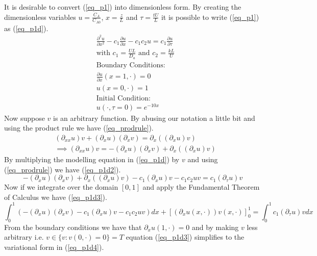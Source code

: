 \documentclass[11pt,fleqn]{article}
\theoremstyle{defstyle}
\begin{document}
It is desirable to convert (\ref{eq_p1}) into dimensionless form. By creating the dimensionless variables $u=\frac{C_A}{C_{A0}}$, $x = \frac{z}{L}$ and $\tau = \frac{tU}{L}$ it is possible to write (\ref{eq_p1}) as (\ref{eq_p1d}).
\begin{equation}
\begin{aligned}
&\frac{\partial^2 u}{\partial x^2} - c_1 \frac{\partial u}{\partial x} - c_1c_2u = 
c_1\frac{\partial u}{\partial \tau} \\
&\text{with } c_1 = \frac{UL}{D_a} \text{ and } c_2 = \frac{kL}{U} \\
&\text{Boundary Conditions:} \\
&\frac{\partial u}{\partial x}(x=1, \cdot) = 0\\
&u(x=0, \cdot) = 1 \\
&\text{Initial Condition:} \\
& u(\cdot, \tau = 0) = e^{-10x}
\end{aligned}
\label{eq_p1d}
\end{equation}
Now suppose $v$ is an arbitrary function. By abusing our notation a little bit and using the product rule we have (\ref{eq_prodrule}).
\begin{equation}
\begin{aligned}
&(\partial_{xx}u)v + (\partial_xu)(\partial_xv) = \partial_x( (\partial_xu)v)\\
&\implies (\partial_{xx}u)v = -(\partial_xu)(\partial_xv) + \partial_x( (\partial_xu)v)
\end{aligned}
\label{eq_prodrule}
\end{equation}
By multiplying the modelling equation in (\ref{eq_p1d}) by $v$ and using (\ref{eq_prodrule}) we have (\ref{eq_p1d2}).
\begin{equation}
 -(\partial_xu)(\partial_xv) + \partial_x( (\partial_xu)v) - c_1(\partial_xu)v - c_1c_2uv = c_1(\partial_{\tau}u)v 
\label{eq_p1d2}
\end{equation}
Now if we integrate over the domain $[0, 1]$ and apply the Fundamental Theorem of Calculus we have (\ref{eq_p1d3}).
\begin{equation}
\int_0^1 (-(\partial_xu)(\partial_xv) - c_1(\partial_xu)v - c_1c_2uv)dx + [(\partial_xu(x, \cdot))v(x, \cdot)]^1_0 = \int^1_0 c_1(\partial_{\tau}u)v dx
\label{eq_p1d3}
\end{equation}
From the boundary conditions we have that $\partial_xu(1,\cdot)=0$ and by making $v$ less arbitrary i.e. $v \in \{v : v(0, \cdot)=0 \} = T$ equation (\ref{eq_p1d3}) simplifies to the variational form in (\ref{eq_p1d4}).
\end{document}
